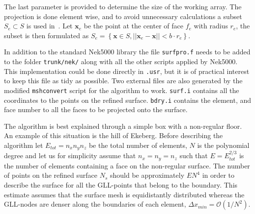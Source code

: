The last parameter is provided to determine the size of the working array. 
The projection is done element wise, and to avoid unnecessary calculations a subset $S_e \subset S$
is used in~.
Let $\mathbf{x}_e$ be the point at the center of face $f_e$
with radius $r_e$, the subset is then formulated as  
$S_e = \left\{ \mathbf{x} \in S , ||\mathbf{x}_e-\mathbf{x}|| < b \cdot r_e \right\}$.


In addition to the standard Nek5000 library the file \verb|surfpro.f| needs to be added to 
the folder \verb|trunk/nek/| along with all the other scripts applied by Nek5000.
This implementation could be done directly in \verb|.usr|, but it is of practical 
interest to keep this file as tidy as possible.
Two external files are also generated by the modified \verb|mshconvert| script for the algorithm to work.
\verb|surf.i| contains all the coordinates to the points on the refined surface. 
\verb|bdry.i| contains the element, and face number to all the faces to be projected onto the surface.

The algorithm is best explained through a simple box with a non-regular floor. 
An example of this situation is the hill of Ekeberg. 
Before describing the algorithm let $E_{tot} = n_xn_yn_z$  be the total number of elements, 
$N$ is the polynomial degree and let us for simplicity assume that $n_x=n_y=n_z$ such that 
$E= E_{tot}^{2/3}$ is the number of elements containing a face on the non-regular surface.
The number of points on the refined surface $N_s$ should be approximately $EN^4$ in 
order to describe the surface for all the GLL-points that belong to the boundary. This estimate
assumes that the surface mesh is equidistantly distributed whereas the GLL-nodes 
are denser along the boundaries of each element, $\Delta x_{min} = \mathcal{O}(1/N^2)$. 

